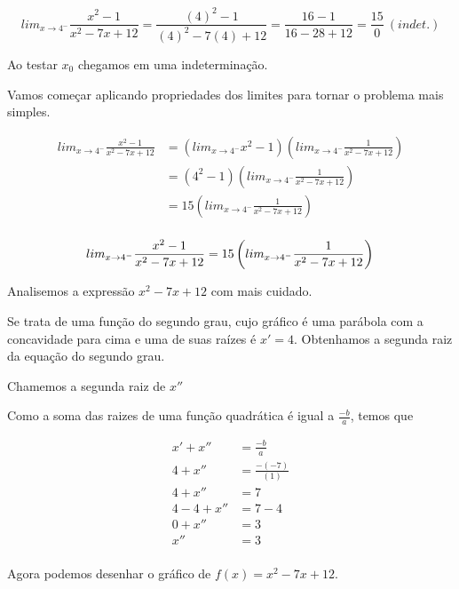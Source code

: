 \documentclass{article}
\begin{document}
\[
    lim_{x\to 4^-} \frac{x^2-1}{x^2-7x+12}
    = \frac{(4)^2-1}{(4)^2-7(4)+12}
    = \frac{16-1}{16-28+12}
    = \frac{15}{0} \ (indet.)
\]

Ao testar \(x_0\) chegamos em uma indeterminação.

Vamos começar aplicando propriedades dos limites para tornar o problema mais simples.

\begin{align*}
    lim_{x\to 4^-} \frac{x^2-1}{x^2-7x+12}
     & = \left(lim_{x\to 4^-} x^2-1\right)
    \left(lim_{x\to 4^-} \frac{1}{x^2-7x+12}\right)        \\
     & = \left(4^2-1\right)
    \left(lim_{x\to 4^-} \frac{1}{x^2-7x+12}\right)        \\
     & = 15\left(lim_{x\to 4^-} \frac{1}{x^2-7x+12}\right) \\
\end{align*}

\begin{equation} \label{eq:lim_x_to_4_exp_with_15}
    lim_{x\to 4^-} \frac{x^2-1}{x^2-7x+12} = 15\left(lim_{x\to 4^-} \frac{1}{x^2-7x+12}\right)  \\
\end{equation}

Analisemos a expressão \(x^2-7x+12\) com mais cuidado.

Se trata de uma função do segundo grau, cujo gráfico é
uma parábola com a concavidade para cima e uma de suas raízes é \(x'=4\).
Obtenhamos a segunda raiz da equação do segundo grau.

Chamemos a segunda raiz de \(x''\)

Como a soma das raizes de uma função quadrática é igual a \(\frac{-b}{a}\), temos que

\begin{align*}
    x' + x''    & = \frac{-b}{a}      \\
    4 + x''     & = \frac{-(-7)}{(1)} \\
    4 + x''     & = 7                 \\
    4 - 4 + x'' & = 7 - 4             \\
    0 + x''     & = 3                 \\
    x''         & = 3                 \\
\end{align*}

Agora podemos desenhar o gráfico de \(f(x) = x^2-7x+12\).
\end{document}
